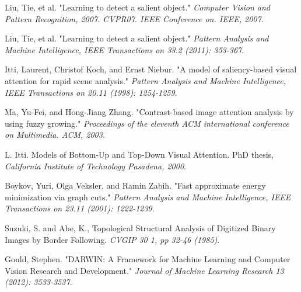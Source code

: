 \documentclass[10pt,twocolumn,letterpaper]{article}
\begin{document}
\begin{thebibliography}{99} \fontsize{9pt}{50} \setlength{\itemsep}{-0.5pt} 
     Liu, Tie, et al. "Learning to detect a salient object." 
        \textit{Computer Vision and Pattern Recognition, 2007. CVPR07. IEEE Conference on. IEEE, 2007}.

     Liu, Tie, et al. "Learning to detect a salient object." 
        \textit{Pattern Analysis and Machine Intelligence, IEEE Transactions on 33.2 (2011): 353-367}. 

     Itti, Laurent, Christof Koch, and Ernst Niebur. "A model of saliency-based visual attention for rapid scene analysis."
        \textit{Pattern Analysis and Machine Intelligence, IEEE Transactions on 20.11 (1998): 1254-1259}.

     Ma, Yu-Fei, and Hong-Jiang Zhang. "Contrast-based image attention analysis by using fuzzy growing."
        \textit{ Proceedings of the eleventh ACM international conference on Multimedia. ACM, 2003}. 

     L. Itti. Models of Bottom-Up and Top-Down Visual Attention. PhD thesis, 
        \textit{California Institute of Technology Pasadena, 2000}.

     Boykov, Yuri, Olga Veksler, and Ramin Zabih. "Fast approximate energy minimization via graph cuts." 
        \textit{Pattern Analysis and Machine Intelligence, IEEE Transactions on 23.11 (2001): 1222-1239}.

     Suzuki, S. and Abe, K., Topological Structural Analysis of Digitized Binary Images by Border Following. 
        \textit{CVGIP 30 1, pp 32-46 (1985)}.

     Gould, Stephen. "DARWIN: A Framework for Machine Learning and Computer Vision Research and Development." 
        \textit{Journal of Machine Learning Research 13 (2012): 3533-3537}.

\end{thebibliography}
\end{document}
